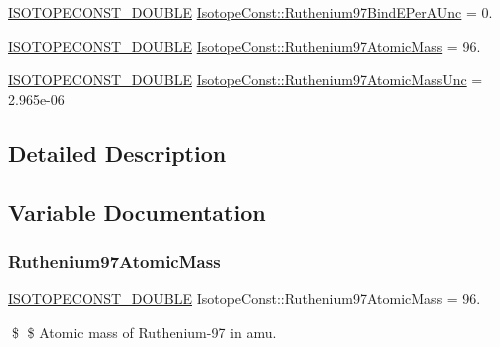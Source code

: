 \begin{DoxyCompactItemize}
\mbox{\hyperlink{group___isotope_const-_macros_ga8f45a7272ce02c0b4c65c44636ed719a}{I\+S\+O\+T\+O\+P\+E\+C\+O\+N\+S\+T\+\_\+\+D\+O\+U\+B\+LE}} \mbox{\hyperlink{group___isotope_const-_ruthenium-_ru97_gacad76cbea9c0c36d5f8fca61c9462f8f}{Isotope\+Const\+::\+Ruthenium97\+Bind\+E\+Per\+A\+Unc}} = 0.
\item 
\mbox{\hyperlink{group___isotope_const-_macros_ga8f45a7272ce02c0b4c65c44636ed719a}{I\+S\+O\+T\+O\+P\+E\+C\+O\+N\+S\+T\+\_\+\+D\+O\+U\+B\+LE}} \mbox{\hyperlink{group___isotope_const-_ruthenium-_ru97_ga06cc487c79d9806fe29f679d30d58951}{Isotope\+Const\+::\+Ruthenium97\+Atomic\+Mass}} = 96.
\item 
\mbox{\hyperlink{group___isotope_const-_macros_ga8f45a7272ce02c0b4c65c44636ed719a}{I\+S\+O\+T\+O\+P\+E\+C\+O\+N\+S\+T\+\_\+\+D\+O\+U\+B\+LE}} \mbox{\hyperlink{group___isotope_const-_ruthenium-_ru97_ga51edf690391c456f5a4f339142fff926}{Isotope\+Const\+::\+Ruthenium97\+Atomic\+Mass\+Unc}} = 2.\+965e-\/06
\end{DoxyCompactItemize}


\subsection{Detailed Description}


\subsection{Variable Documentation}
\mbox{\label{group___isotope_const-_ruthenium-_ru97_ga06cc487c79d9806fe29f679d30d58951}} 
\subsubsection{\texorpdfstring{Ruthenium97\+Atomic\+Mass}{Ruthenium97AtomicMass}}
{\footnotesize\ttfamily \mbox{\hyperlink{group___isotope_const-_macros_ga8f45a7272ce02c0b4c65c44636ed719a}{I\+S\+O\+T\+O\+P\+E\+C\+O\+N\+S\+T\+\_\+\+D\+O\+U\+B\+LE}} Isotope\+Const\+::\+Ruthenium97\+Atomic\+Mass = 96.}

\$ \$ Atomic mass of Ruthenium-\/97 in amu. \mbox{\label{group___isotope_const-_ruthenium-_ru97_ga51edf690391c456f5a4f339142fff926}} 

